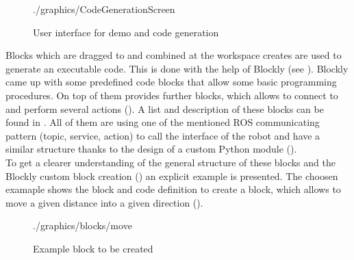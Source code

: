 \begin{figure}[htbp]
	\centering
	\begin{overpic}[width=\linewidth]{./graphics/CodeGenerationScreen}
	\end{overpic}
	\caption{User interface for demo and code generation}%
	\label{fig:CodeGeneration}%
\end{figure}

Blocks which are dragged to and combined at the workspace creates are used to generate an executable code. This is done with the help of Blockly (see ). Blockly came up with some predefined code blocks that allow some basic programming procedures.
On top of them \toolname{} provides further blocks, which allows to connect to \hobbit{} and perform several actions (). A list and description of these blocks can be found in . All of them are using one of the mentioned ROS communicating pattern (topic, service, action) to call the interface of the robot and have a similar structure thanks to the design of a custom Python module (). \\

To get a clearer understanding of the general structure of these blocks and the Blockly custom block creation () an explicit example is presented. The choosen examaple shows the block and code definition to create a block, which allows to move \hobbit{} a given distance into a given direction ().

\begin{figure}[htbp]
	\centering
	\begin{overpic}[width=0.3\linewidth]{./graphics/blocks/move}
	\end{overpic}
	\caption{Example block to be created}%
	\label{fig:ExBlockMove}%
\end{figure}

\begin{figure}[htbp]
	
\end{figure}

